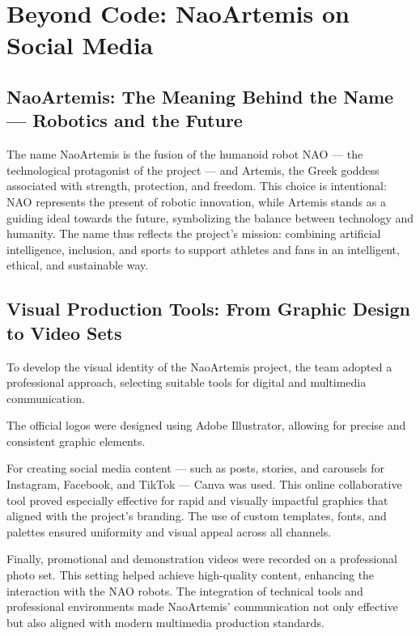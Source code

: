 \documentclass{optica-article}
\begin{document}
\bigskip
\section{Beyond Code: NaoArtemis on Social Media}

\subsection{NaoArtemis: The Meaning Behind the Name — Robotics and the Future}
The name NaoArtemis is the fusion of the humanoid robot NAO — the technological protagonist of the project — and Artemis, the Greek goddess associated with strength, protection, and freedom. This choice is intentional: NAO represents the present of robotic innovation, while Artemis stands as a guiding ideal towards the future, symbolizing the balance between technology and humanity. The name thus reflects the project's mission: combining artificial intelligence, inclusion, and sports to support athletes and fans in an intelligent, ethical, and sustainable way.

\subsection{Visual Production Tools: From Graphic Design to Video Sets}
To develop the visual identity of the NaoArtemis project, the team adopted a professional approach, selecting suitable tools for digital and multimedia communication.

The official logos were designed using Adobe Illustrator, allowing for precise and consistent graphic elements.

For creating social media content — such as posts, stories, and carousels for Instagram, Facebook, and TikTok — Canva was used. This online collaborative tool proved especially effective for rapid and visually impactful graphics that aligned with the project’s branding. The use of custom templates, fonts, and palettes ensured uniformity and visual appeal across all channels.

Finally, promotional and demonstration videos were recorded on a professional photo set. This setting helped achieve high-quality content, enhancing the interaction with the NAO robots. The integration of technical tools and professional environments made NaoArtemis' communication not only effective but also aligned with modern multimedia production standards.
\end{document}
